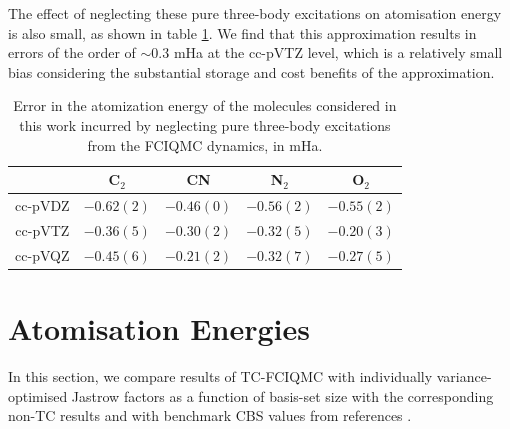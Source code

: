 The effect of neglecting these pure three-body excitations on atomisation energy is also small, as shown in table \ref{table:no3_Eat_error}. We find that this approximation results in errors of the order of
$\sim0.3$ mHa at the cc-pVTZ level, which is a relatively small bias
considering the substantial storage and cost benefits of the
approximation.

\begin{table}[htbp]
    \centering
    \begin{tabular}{cllll}
                              &
    \multicolumn{1}{c}{C$_2$} &
    \multicolumn{1}{c}{CN   } &
    \multicolumn{1}{c}{N$_2$} &
    \multicolumn{1}{c}{O$_2$} \\
    \hline \hline
    cc-pVDZ   & $-0.62(2)$ & $-0.46(0)$ & $-0.56(2)$ & $-0.55(2)$ \\
    cc-pVTZ   & $-0.36(5)$ & $-0.30(2)$ & $-0.32(5)$ & $-0.20(3)$ \\
    cc-pVQZ   & $-0.45(6)$ & $-0.21(2)$ & $-0.32(7)$ & $-0.27(5)$ \\
    \hline
    \end{tabular}
    \caption{
      Error in the atomization energy of the molecules considered in this
      work incurred by neglecting pure three-body excitations from the
      FCIQMC dynamics, in mHa.
      \label{table:no3_Eat_error}}
  \end{table}

\section{Atomisation Energies}

In this section, we compare results of TC-FCIQMC with individually variance-optimised Jastrow factors as a function of basis-set size with the corresponding non-TC results and with benchmark \gls{CBS} values from references .

